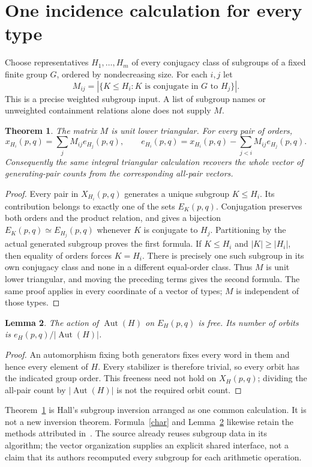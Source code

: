 \documentclass[11pt,a4paper]{article}
\newtheorem{theorem}{Theorem}
\newtheorem{lemma}[theorem]{Lemma}
\newcommand{\Aut}{\operatorname{Aut}}
\begin{document}
\section{One incidence calculation for every type}
Choose representatives $H_1,\ldots,H_m$ of every conjugacy class of
subgroups of a fixed finite group $G$, ordered by nondecreasing size.
For each $i,j$ let
\[
 M_{ij}=|\{K\leq H_i:K\text{ is conjugate in }G\text{ to }H_j\}|.
\]
This is a precise weighted subgroup input. A list of subgroup names or
unweighted containment relations alone does not supply $M$.

\begin{theorem}\label{inc}
The matrix $M$ is unit lower triangular. For every pair of orders,
\[
 x_{H_i}(p,q)=\sum_j M_{ij}e_{H_j}(p,q),\qquad
 e_{H_i}(p,q)=x_{H_i}(p,q)-\sum_{j<i}M_{ij}e_{H_j}(p,q).
\]
Consequently the same integral triangular calculation recovers the whole
vector of generating-pair counts from the corresponding all-pair vectors.
\end{theorem}
\begin{proof}
Every pair in $X_{H_i}(p,q)$ generates a unique subgroup $K\leq H_i$.
Its contribution belongs to exactly one of the sets $E_K(p,q)$. Conjugation
preserves both orders and the product relation, and gives a bijection
$E_K(p,q)\simeq E_{H_j}(p,q)$ whenever $K$ is conjugate to $H_j$.
Partitioning by the actual generated subgroup proves the first formula.
If $K\leq H_i$ and $|K|\geq|H_i|$, then equality of orders forces
$K=H_i$. There is precisely one such subgroup in its own conjugacy class
and none in a different equal-order class. Thus $M$ is unit lower triangular,
and moving the preceding terms gives the second formula. The same proof
applies in every coordinate of a vector of types; $M$ is independent of
those types.
\end{proof}

\begin{lemma}\label{free}
The action of $\Aut(H)$ on $E_H(p,q)$ is free. Its number of orbits is
$e_H(p,q)/|\Aut(H)|$.
\end{lemma}
\begin{proof}
An automorphism fixing both generators fixes every word in them and hence
every element of $H$. Every stabilizer is therefore trivial, so every orbit
has the indicated group order. This freeness need not hold on $X_H(p,q)$;
dividing the all-pair count by $|\Aut(H)|$ is not the required orbit count.
\end{proof}

Theorem~\ref{inc} is Hall's subgroup inversion arranged as one common
calculation. It is not a new inversion theorem. Formula~\eqref{char} and
Lemma~\ref{free} likewise retain the methods attributed in~\cite{CL}.
The source already reuses subgroup data in its algorithm; the vector
organization supplies an explicit shared interface, not a claim that its
authors recomputed every subgroup for each arithmetic operation.
\end{document}
